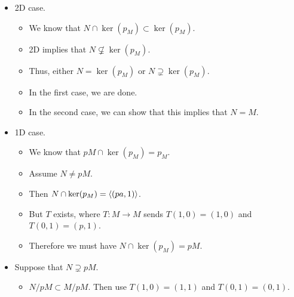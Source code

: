 \documentclass[../notes.tex]{subfiles}
\begin{document}
\begin{itemize}
\begin{itemize}
        \item 2D case.
        \begin{itemize}
            \item We know that $N\cap\ker(p_M)\subset\ker(p_M)$.
            \item 2D implies that $N\not\subsetneq\ker(p_M)$.
            \item Thus, either $N=\ker(p_M)$ or $N\supsetneq\ker(p_M)$.
            \item In the first case, we are done.
            \item In the second case, we can show that this implies that $N=M$.
        \end{itemize}
        \item 1D case.
        \begin{itemize}
            \item We know that $pM\cap\ker(p_M)=p_M$.
            \item Assume $N\neq pM$.
            \item Then $N\cap\ker(p_M)=\left\langle{(pa,1)}\right\rangle$.
            \item But $T$ exists, where $T:M\to M$ sends $T(1,0)=(1,0)$ and $T(0,1)=(p,1)$.
            \item Therefore we must have $N\cap\ker(p_M)=pM$.
        \end{itemize}
        \item Suppose that $N\supsetneq pM$.
        \begin{itemize}
            \item $N/pM\subset M/pM$. Then use $T(1,0)=(1,1)$ and $T(0,1)=(0,1)$.
        \end{itemize}
    \end{itemize}
\end{itemize}
\end{document}
